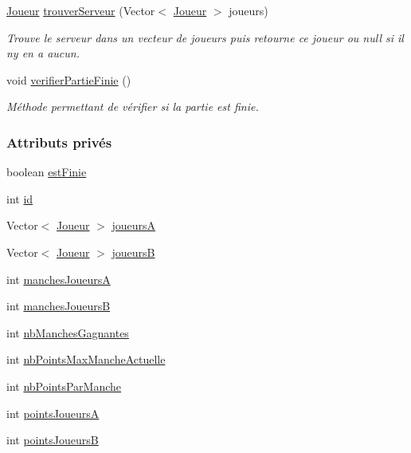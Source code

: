 \begin{DoxyCompactItemize}
\hyperlink{classcom_1_1example_1_1area_1_1_joueur}{Joueur} \hyperlink{classcom_1_1example_1_1area_1_1_partie_a34c737de89dee9e2510fa5959e238a3e}{trouver\+Serveur} (Vector$<$ \hyperlink{classcom_1_1example_1_1area_1_1_joueur}{Joueur} $>$ joueurs)
\begin{DoxyCompactList}\small\item\em Trouve le serveur dans un vecteur de joueurs puis retourne ce joueur ou null si il n\textquotesingle{}y en a aucun. \end{DoxyCompactList}\item 
void \hyperlink{classcom_1_1example_1_1area_1_1_partie_ad07c65c2ba36cd08798cee1ba6b99c81}{verifier\+Partie\+Finie} ()
\begin{DoxyCompactList}\small\item\em Méthode permettant de vérifier si la partie est finie. \end{DoxyCompactList}\end{DoxyCompactItemize}
\subsubsection*{Attributs privés}
\begin{DoxyCompactItemize}
\item 
boolean \hyperlink{classcom_1_1example_1_1area_1_1_partie_a00890390c78922c024fe31065923964e}{est\+Finie}
\item 
int \hyperlink{classcom_1_1example_1_1area_1_1_partie_a06ef6dd2585a669a8230ed1217cd98f4}{id}
\item 
Vector$<$ \hyperlink{classcom_1_1example_1_1area_1_1_joueur}{Joueur} $>$ \hyperlink{classcom_1_1example_1_1area_1_1_partie_a190a033a96ec435589ac53f78d60890b}{joueursA}
\item 
Vector$<$ \hyperlink{classcom_1_1example_1_1area_1_1_joueur}{Joueur} $>$ \hyperlink{classcom_1_1example_1_1area_1_1_partie_a208910b83df461c3a2503f3b28650ce8}{joueursB}
\item 
int \hyperlink{classcom_1_1example_1_1area_1_1_partie_a4563ef3464c670e68405bb7256abb770}{manches\+JoueursA}
\item 
int \hyperlink{classcom_1_1example_1_1area_1_1_partie_a9bb9a60be0b966b5a8bd5ac0934387bf}{manches\+JoueursB}
\item 
int \hyperlink{classcom_1_1example_1_1area_1_1_partie_a1d1d6ce602fecf229217fe3d7a4d9152}{nb\+Manches\+Gagnantes}
\item 
int \hyperlink{classcom_1_1example_1_1area_1_1_partie_a4b5e5464eb3b37f7c78d4134bf29a7f8}{nb\+Points\+Max\+Manche\+Actuelle}
\item 
int \hyperlink{classcom_1_1example_1_1area_1_1_partie_a23cd7e19042eece7057f810bba2f4f2c}{nb\+Points\+Par\+Manche}
\item 
int \hyperlink{classcom_1_1example_1_1area_1_1_partie_ad1075e561acb71ac3307570f79795b1c}{points\+JoueursA}
\item 
int \hyperlink{classcom_1_1example_1_1area_1_1_partie_ae1ceb321b45437487124b1d886c7297c}{points\+JoueursB}
\end{DoxyCompactItemize}
